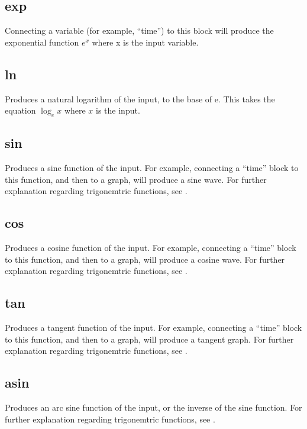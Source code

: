 \subsection{exp}\label{Operation:exp} Connecting a variable (for example, ``time'')
to this block will produce the exponential function $e^{x}$ where x is
the input variable.

\subsection{ln}\label{Operation:ln} Produces a natural logarithm of the input, to the base of e.
This takes the equation $\log_{e} x$ where $x$ is the input.

\subsection{sin}\label{Operation:sin} Produces a sine function of the input. For example, 
connecting a ``time'' block to this function, and then to a graph,
will produce a sine wave.  For further explanation regarding
trigonemtric functions, see .

\subsection{cos}\label{Operation:cos} Produces a cosine function of the input. For example, 
connecting a ``time'' block to this function, and then to a graph,
will produce a cosine wave.  For further explanation regarding
trigonemtric functions, see .

\subsection{tan}\label{Operation:tan} Produces a tangent function of the input. For example, 
connecting a ``time'' block to this function, and then to a graph,
will produce a tangent graph.  For further explanation regarding
trigonemtric functions, see .

\subsection{asin}\label{Operation:asin} Produces an arc sine function of the input, 
or the inverse of the sine function. For further explanation regarding
trigonemtric functions, see .

